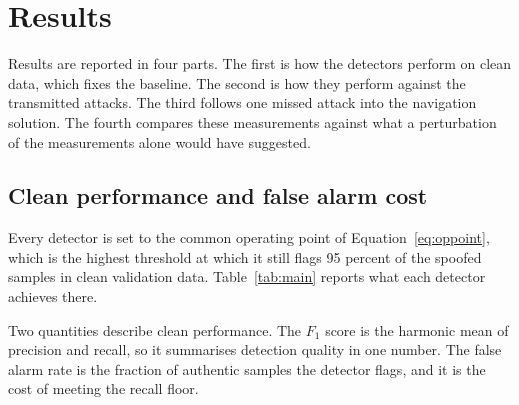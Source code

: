 \section{Results}
\label{sec:results}

Results are reported in four parts. The first is how the detectors perform on clean
data, which fixes the baseline. The second is how they perform against the transmitted
attacks. The third follows one missed attack into the navigation solution. The fourth
compares these measurements against what a perturbation of the measurements alone would
have suggested.

\subsection{Clean performance and false alarm cost}
\label{sec:res_clean}

Every detector is set to the common operating point of Equation~\ref{eq:oppoint}, which
is the highest threshold at which it still flags 95 percent of the spoofed samples in
clean validation data. Table~\ref{tab:main} reports what each detector achieves there.

Two quantities describe clean performance. The $F_1$ score is the harmonic mean of
precision and recall, so it summarises detection quality in one number. The false alarm
rate is the fraction of authentic samples the detector flags, and it is the cost of
meeting the recall floor.

